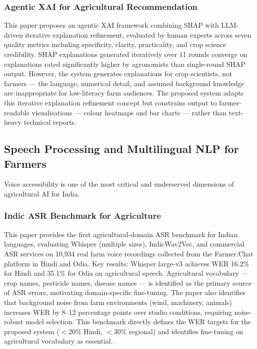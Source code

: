 \documentclass[12pt,a4paper]{article}
\begin{document}
\subsubsection{Agentic XAI for Agricultural Recommendation}
This paper proposes an agentic XAI framework combining SHAP with LLM-driven iterative explanation refinement, evaluated by human experts across seven quality metrics including specificity, clarity, practicality, and crop science credibility. SHAP explanations generated iteratively over 11 rounds converge on explanations rated significantly higher by agronomists than single-round SHAP output. However, the system generates explanations for crop scientists, not farmers --- the language, numerical detail, and assumed background knowledge are inappropriate for low-literacy farm audiences. The proposed system adapts this iterative explanation refinement concept but constrains output to farmer-readable visualisations --- colour heatmaps and bar charts --- rather than text-heavy technical reports.

\subsection{Speech Processing and Multilingual NLP for Farmers}
Voice accessibility is one of the most critical and underserved dimensions of agricultural AI for India.

\subsubsection{Indic ASR Benchmark for Agriculture \cite{indicasr2025}}
This paper provides the first agricultural-domain ASR benchmark for Indian languages, evaluating Whisper (multiple sizes), IndicWav2Vec, and commercial ASR services on 10,934 real farm voice recordings collected from the Farmer.\allowbreak Chat platform in Hindi and Odia. Key results: Whisper large-v3 achieves WER 16.2\% for Hindi and 35.1\% for Odia on agricultural speech. Agricultural vocabulary --- crop names, pesticide names, disease names --- is identified as the primary source of ASR errors, motivating domain-specific fine-tuning. The paper also identifies that background noise from farm environments (wind, machinery, animals) increases WER by 8--12 percentage points over studio conditions, requiring noise-robust model selection. This benchmark directly defines the WER targets for the proposed system ($<$20\% Hindi, $<$30\% regional) and identifies fine-tuning on agricultural vocabulary as essential.
\end{document}
